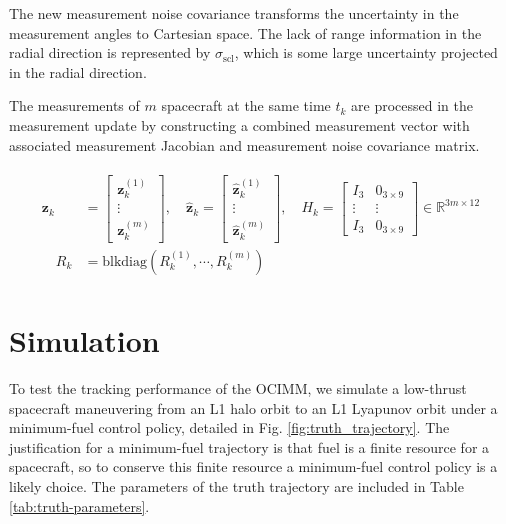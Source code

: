 \documentclass[letterpaper, preprint, paper,11pt]{AAS}	%
\newcommand{\R}{\mathbb{R}}
\begin{document}
The new measurement noise covariance transforms the uncertainty in the measurement angles to Cartesian space. The lack of range information in the radial direction is represented by $\sigma_\text{scl}$, which is some large uncertainty projected in the radial direction. 

The measurements of $m$ spacecraft at the same time $t_k$ are processed in the measurement update by constructing a combined measurement vector with associated measurement Jacobian and measurement noise covariance matrix. 

\begin{align}
\begin{aligned}
    \bm{z}_k &= \begin{bmatrix}
        \bm{z}_k^{(1)} \\
        \vdots \\
        \bm{z}_k^{(m)}
    \end{bmatrix}, \quad \hat{\bm{z}}_k = \begin{bmatrix}
        \hat{\bm{z}}_k^{(1)} \\
        \vdots \\
        \hat{\bm{z}}_k^{(m)}
    \end{bmatrix}, \quad H_k = \begin{bmatrix}
        I_3 & 0_{3\times9} \\
        \vdots & \vdots \\
        I_3 & 0_{3\times9}
    \end{bmatrix} \in \R^{3m \times 12} \\
    \quad R_k &= \text{blkdiag}(R_k^{(1)}, \cdots, R_k^{(m)})
\end{aligned}
\end{align}

\section{Simulation}

To test the tracking performance of the OCIMM, we simulate a low-thrust spacecraft maneuvering from an L1 halo orbit to an L1 Lyapunov orbit under a minimum-fuel control policy, detailed in Fig. \ref{fig:truth_trajectory}. The justification for a minimum-fuel trajectory is that fuel is a finite resource for a spacecraft, so to conserve this finite resource a minimum-fuel control policy is a likely choice. The parameters of the truth trajectory are included in Table \ref{tab:truth-parameters}.
\end{document}
